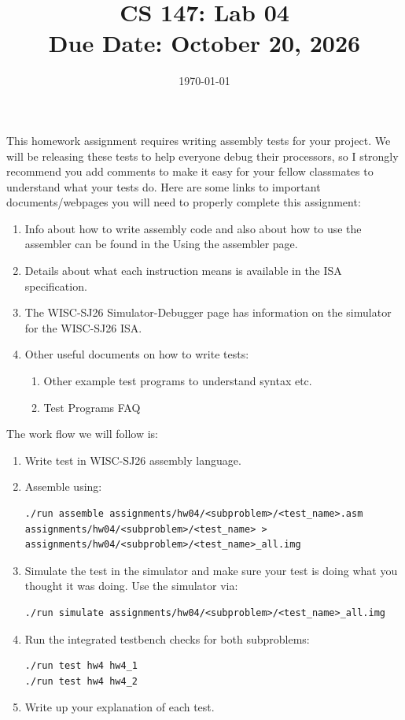\documentclass[12pt]{article}
\title{CS 147: Lab 04 \\ Due Date: October 20, 2026}
\author{}
\date{\today}
\begin{document}
\maketitle

This homework assignment requires writing assembly tests for your project. We will be releasing these
tests to help everyone debug their processors, so I strongly recommend you add comments to make
it easy for your fellow classmates to understand what your tests do. Here are some links to important
documents/webpages you will need to properly complete this assignment:

\begin{enumerate}
\item
Info about how to write assembly code and also about how to use the assembler can be found in
the Using the assembler page.
\item Details about what each instruction means is available in the ISA specification.
\item The WISC-SJ26 Simulator-Debugger page has information on the simulator for the WISC-SJ26
ISA.
\item Other useful documents on how to write tests:
\begin{enumerate}
\item Other example test programs to understand syntax etc.
\item Test Programs FAQ
\end{enumerate}

\end{enumerate}

The work flow we will follow is:
\begin{enumerate}
\item Write test in WISC-SJ26 assembly language.
\item Assemble using:
\begin{lstlisting}[basicstyle=\ttfamily\small,breaklines=true]
./run assemble assignments/hw04/<subproblem>/<test_name>.asm assignments/hw04/<subproblem>/<test_name> > assignments/hw04/<subproblem>/<test_name>_all.img
\end{lstlisting}
\item Simulate the test in the simulator and make sure your test is doing what you thought it was doing.
Use the simulator via:
\begin{verbatim}
./run simulate assignments/hw04/<subproblem>/<test_name>_all.img
\end{verbatim}
\item Run the integrated testbench checks for both subproblems:
\begin{verbatim}
./run test hw4 hw4_1
./run test hw4 hw4_2
\end{verbatim}
\item Write up your explanation of each test.
\end{enumerate}
\end{document}
